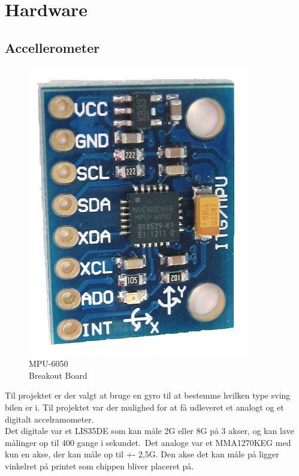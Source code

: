 \section{Hardware}

\subsection{Accellerometer}

\begin{figure}
	\begin{minipage}{.3\textwidth}\centering
		\includegraphics[scale=0.2]{Billeder/mpu-6050.jpg}
		\caption{MPU-6050\\Breakout Board}
		\label{fig:MPU-6050-Breakout}
	\end{minipage}
\end{figure}

Til projektet er der valgt at bruge en gyro til at bestemme hvilken type sving bilen er i. Til projektet var der mulighed for at få udleveret et analogt og et digitalt accelramometer.
\\Det digitale var et LIS35DE som kan måle \textpm 2G eller \textpm 8G på 3 akser, og kan lave målinger op til 400 gange i sekundet.\ Det analoge var et MMA1270KEG med kun en akse, der kan måle op til +- 2,5G. Den akse det kan måle på ligger vinkelret på printet som chippen bliver placeret på.
\linebreak

